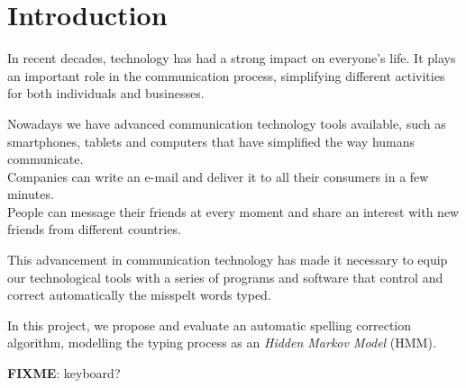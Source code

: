 \chapter{Introduction}
\label{chap:Introduction}

In recent decades, technology has had a strong impact on everyone's life.
It plays an important role in the communication process, simplifying 
different activities for both individuals and businesses.

Nowadays we have advanced communication technology tools available, 
such as smartphones, tablets and computers that have simplified the way 
humans communicate. \\
Companies can write an e-mail and deliver it to all their consumers in a few 
minutes. \\
People can message their friends at every moment and share an interest 
with new friends from different countries.

This advancement in communication technology has made it necessary to 
equip our technological tools with a series of programs and software that 
control and correct automatically the misspelt words typed.

In this project, we propose and evaluate an automatic spelling correction 
algorithm, modelling the typing process as an \textit{Hidden Markov 
Model} (HMM). 


\textbf{FIXME}:  keyboard? 
